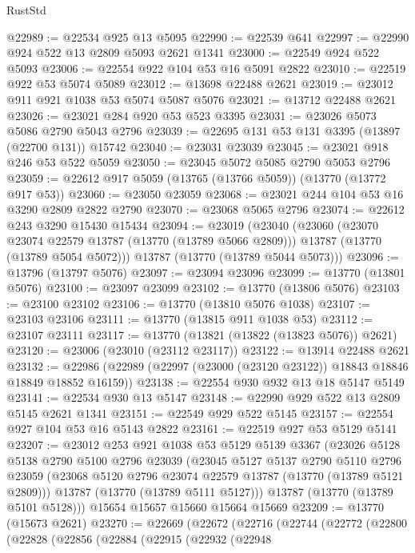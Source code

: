 \begin{lexlean}{RustStd}
\begin{coremodule}
@22989 := @22534 @925 @13 @5095
@22990 := @22539 @641
@22997 := @22990 @924 @522 @13 @2809 @5093 @2621 @1341
@23000 := @22549 @924 @522 @5093
@23006 := @22554 @922 @104 @53 @16 @5091 @2822
@23010 := @22519 @922 @53 @5074 @5089
@23012 := @13698 @22488 @2621
@23019 := @23012 @911 @921 @1038 @53 @5074 @5087 @5076
@23021 := @13712 @22488 @2621
@23026 := @23021 @284 @920 @53 @523 @3395
@23031 := @23026 @5073 @5086 @2790 @5043 @2796
@23039 := @22695 @131 @53 @131 @3395 (@13897 (@22700 @131)) @15742
@23040 := @23031 @23039
@23045 := @23021 @918 @246 @53 @522 @5059
@23050 := @23045 @5072 @5085 @2790 @5053 @2796
@23059 := @22612 @917 @5059 (@13765 (@13766 @5059)) (@13770 (@13772 @917 @53))
@23060 := @23050 @23059
@23068 := @23021 @244 @104 @53 @16 @3290 @2809 @2822 @2790
@23070 := @23068 @5065 @2796
@23074 := @22612 @243 @3290 @15430 @15434
@23094 := @23019
    (@23040
      (@23060
        (@23070 @23074 @22579 @13787 (@13770 (@13789 @5066 @2809)))
        @13787
        (@13770 (@13789 @5054 @5072)))
      @13787
      (@13770 (@13789 @5044 @5073)))
@23096 := @13796 (@13797 @5076)
@23097 := @23094 @23096
@23099 := @13770 (@13801 @5076)
@23100 := @23097 @23099
@23102 := @13770 (@13806 @5076)
@23103 := @23100 @23102
@23106 := @13770 (@13810 @5076 @1038)
@23107 := @23103 @23106
@23111 := @13770 (@13815 @911 @1038 @53)
@23112 := @23107 @23111
@23117 := @13770 (@13821 (@13822 (@13823 @5076)) @2621)
@23120 := @23006 (@23010 (@23112 @23117))
@23122 := @13914 @22488 @2621
@23132 := @22986 (@22989 (@22997 (@23000 (@23120 @23122)) @18843 @18846 @18849 @18852 @16159))
@23138 := @22554 @930 @932 @13 @18 @5147 @5149
@23141 := @22534 @930 @13 @5147
@23148 := @22990 @929 @522 @13 @2809 @5145 @2621 @1341
@23151 := @22549 @929 @522 @5145
@23157 := @22554 @927 @104 @53 @16 @5143 @2822
@23161 := @22519 @927 @53 @5129 @5141
@23207 := @23012
    @253
    @921
    @1038
    @53
    @5129
    @5139
    @3367
    (@23026
      @5128
      @5138
      @2790
      @5100
      @2796
      @23039
      (@23045
        @5127
        @5137
        @2790
        @5110
        @2796
        @23059
        (@23068 @5120 @2796 @23074 @22579 @13787 (@13770 (@13789 @5121 @2809)))
        @13787
        (@13770 (@13789 @5111 @5127)))
      @13787
      (@13770 (@13789 @5101 @5128)))
    @15654
    @15657
    @15660
    @15664
    @15669
@23209 := @13770 (@15673 @2621)
@23270 := @22669
    (@22672
      (@22716
        (@22744
          (@22772
            (@22800
              (@22828
                (@22856
                  (@22884
                    (@22915
                      (@22932
                        (@22948

\end{coremodule}
\end{lexlean}
